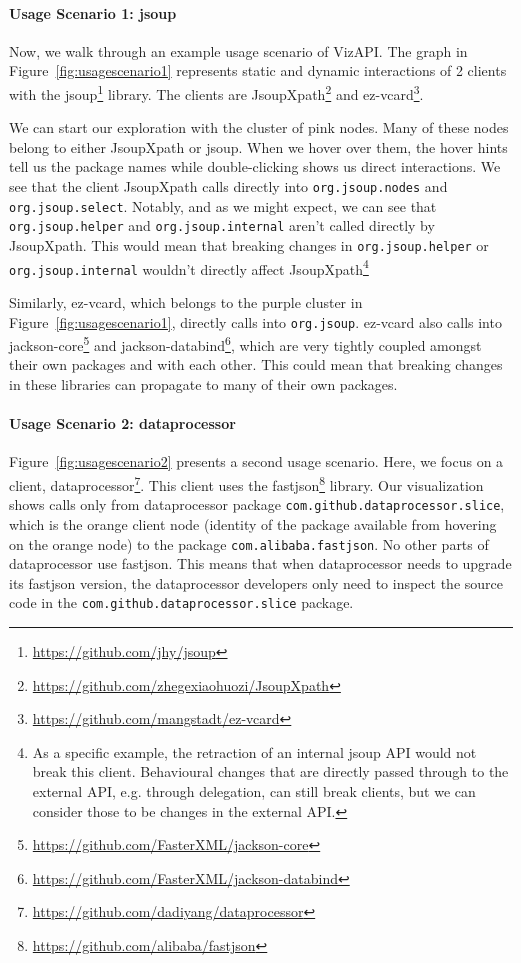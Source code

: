 \paragraph{Usage Scenario 1: jsoup}
Now, we walk through an example usage scenario of VizAPI.
The graph in Figure~\ref{fig:usagescenario1} represents static and dynamic interactions of 2 clients with the jsoup\footnote{\url{https://github.com/jhy/jsoup}\label{jsoup}} library. The clients are JsoupXpath\footnote{\url{https://github.com/zhegexiaohuozi/JsoupXpath}\label{jsoupxpath}} and ez-vcard\footnote{\url{https://github.com/mangstadt/ez-vcard}\label{ez-vcard}}.

We can start our exploration with the cluster of pink nodes. Many of these nodes belong to either JsoupXpath or jsoup. When we hover over them, the hover hints tell us the package names while double-clicking shows us direct interactions. We see that the client JsoupXpath calls directly into \texttt{org.jsoup.nodes} and \texttt{org.jsoup.select}. Notably, and as we might expect, we can see that \texttt{org.jsoup.helper} and \texttt{org.jsoup.internal} aren't called directly by JsoupXpath. This would mean that breaking changes in \texttt{org.jsoup.helper} or \texttt{org.jsoup.internal} wouldn't directly affect JsoupXpath\footnote{As a specific example, the retraction of an internal jsoup API would not break this client. Behavioural changes that are directly passed through to the external API, e.g. through delegation, can still break clients, but we can consider those to be changes in the external API.} 

Similarly, ez-vcard, which belongs to the purple cluster in Figure~\ref{fig:usagescenario1}, directly calls into \texttt{org.jsoup}. ez-vcard also calls into jackson-core\footnote{\url{https://github.com/FasterXML/jackson-core}\label{jackson-core}} and jackson-databind\footnote{\url{https://github.com/FasterXML/jackson-databind}\label{jackson-databind}}, which are very tightly coupled amongst their own packages and with each other. This could mean that breaking changes in these libraries can propagate to many of their own packages.

\paragraph{Usage Scenario 2: dataprocessor}

Figure~\ref{fig:usagescenario2} presents a second usage scenario. Here, we focus on a client, dataprocessor\footnote{\url{https://github.com/dadiyang/dataprocessor}\label{dataprocessor}}. This client uses the fastjson\footnote{\url{https://github.com/alibaba/fastjson}\label{fastjson}} library. Our visualization shows calls only from dataprocessor package \texttt{com.github.dataprocessor.slice}, which is the orange client node (identity of the package available from hovering on the orange node) to the package \texttt{com.alibaba.fastjson}. No other parts of dataprocessor use fastjson. This means that when dataprocessor needs to upgrade its fastjson version, the dataprocessor developers only need to inspect the source code in the \texttt{com.github.dataprocessor.slice} package. 

